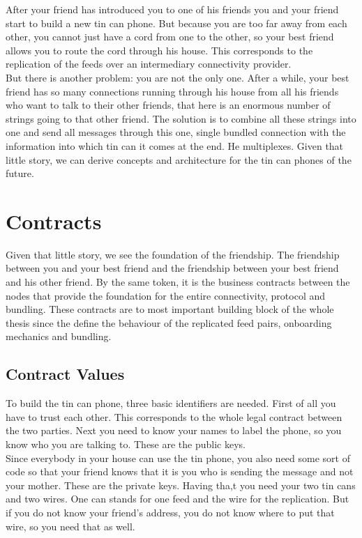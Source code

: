 After your friend has introduced you to one of his friends you and your friend start to build a new tin can phone. But because you are too far away from each other, you cannot just have a cord from one to the other, so your best friend allows you to route the cord through his house. This corresponds to the replication of the feeds over an intermediary connectivity provider.\\

But there is another problem: you are not the only one. After a while, your best friend has so many connections running through his house from all his friends who want to talk to their other friends, that here is an enormous number of strings going to that other friend. The solution is to combine all these strings into one and send all messages through this one, single bundled connection with the information into which tin can it comes at the end. He multiplexes. Given that little story, we can derive concepts and architecture for the tin can phones of the future. 
\section{Contracts}
Given that little story, we see the foundation of the friendship. The friendship between you and your best friend and the friendship between your best friend and his other friend. By the same token, it is the business contracts between the nodes that provide the foundation for the entire connectivity, protocol and bundling. These contracts are to most important building block of the whole thesis since the define the behaviour of the replicated feed pairs,  onboarding mechanics and bundling.

\subsection{Contract Values}
To build the tin can phone, three basic identifiers are needed. First of all you have to trust each other. This corresponds to the whole legal contract between the two parties. Next you need to know your names to label the phone, so you know who you are talking to. These are the public keys. \\

Since everybody in your house can use the tin phone, you also need some sort of code so that your friend knows that it is you who is sending the message and not your mother. These are the private keys. Having tha,t you need your two tin cans and two wires. One can stands for one feed and the wire for the replication. But if you do not know your friend’s address, you do not know where to put that wire, so you need that as well. 


